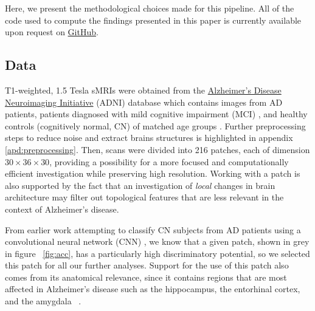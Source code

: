 \documentclass{article}
\begin{document}
Here, we present the methodological choices made for this pipeline. All of the code used to compute
the findings presented in this paper is currently available upon request on
\href{https://github.com/pjhartout/TDA_ADNI_MLCB}{GitHub}.

\subsection{Data}

T1-weighted, 1.5 Tesla sMRIs were obtained from the \href{adni.loni.usc.edu}{Alzheimer's Disease
  Neuroimaging Initiative} (ADNI) database which contains images from AD patients, patients
diagnosed with mild cognitive impairment (MCI) \citep{gauthier2006mild}, and healthy controls
(cognitively normal, CN) of matched age groups \citep{jack2008alzheimer}. Further preprocessing
steps to reduce noise and extract brains structures is highlighted in appendix
\ref{apd:preprocessing}. Then, scans were divided into 216 patches, each of dimension
$30\times36\times30$, providing a possibility for a more focused and computationally efficient
investigation while preserving high resolution. Working with a patch is also supported by the fact
that an investigation of \emph{local} changes in brain architecture may filter out topological
features that are less relevant in the context of Alzheimer's disease.

From earlier work attempting to classify CN subjects from AD patients using a convolutional neural
network (CNN) \citep{bruningk2020image}, we know that a given patch, shown in grey in figure
~\ref{fig:acc}, has a particularly high discriminatory potential, so we selected this patch for all
our further analyses. Support for the use of this patch also comes from its anatomical relevance,
since it contains regions that are most affected in Alzheimer's disease such as the
hippocampus, the entorhinal cortex, and the amygdala ~\citep{goedert2006century}.
\end{document}

